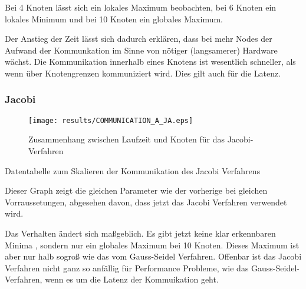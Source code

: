 \documentclass[a4paper,12pt]{scrartcl}
\begin{document}
Bei 4 Knoten lässt sich ein lokales Maximum beobachten, bei 6 Knoten ein lokales Minimum und bei 10 Knoten ein globales Maximum.

Der Anstieg der Zeit lässt sich dadurch erklären, dass bei mehr Nodes der
Aufwand der Kommunkation im Sinne von nötiger (langsamerer) Hardware wächst. Die Kommunikation innerhalb eines Knotens ist wesentlich schneller, als wenn über Knotengrenzen kommuniziert wird.
Dies gilt auch für die Latenz.


\subsubsection{Jacobi}
\begin{figure}[hr!]
\texttt{[image: results/COMMUNICATION\_A\_JA.eps]}
 \caption{Zusammenhang zwischen Laufzeit und Knoten für das Jacobi-Verfahren}
\end{figure}
\begin{table}[hl!]

\caption{Datentabelle zum Skalieren der Kommunikation des Jacobi Verfahrens}
\end{table}

Dieser Graph zeigt die gleichen Parameter wie der vorherige bei gleichen Vorraussetungen, abgesehen davon, dass jetzt das Jacobi Verfahren verwendet wird. 

Das Verhalten ändert sich maßgeblich. Es gibt jetzt keine klar erkennbaren Minima , sondern nur ein globales Maximum bei 10 Knoten. Dieses Maximum ist aber nur halb sogroß wie das vom Gauss-Seidel Verfahren.
Offenbar ist das Jacobi Verfahren nicht ganz so anfällig für Performance Probleme, wie das Gauss-Seidel-Verfahren, wenn es um die Latenz der Kommuikation geht.
\newpage
\FloatBarrier
\end{document}
